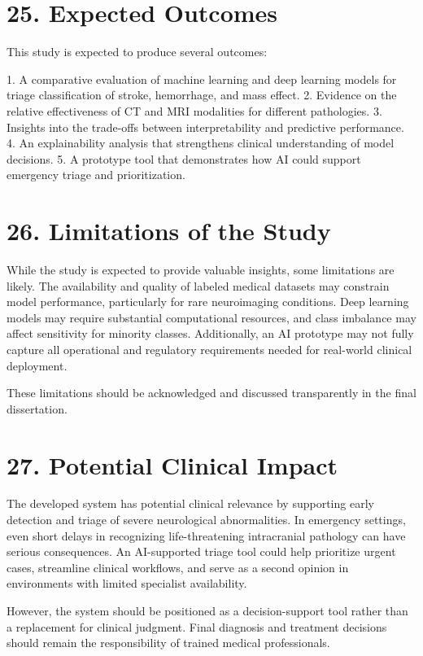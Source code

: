 \documentclass[12pt,a4paper]{report}
\begin{document}
\section{25. Expected Outcomes}

This study is expected to produce several outcomes:

1. A comparative evaluation of machine learning and deep learning models for triage classification of stroke, hemorrhage, and mass effect.
2. Evidence on the relative effectiveness of CT and MRI modalities for different pathologies.
3. Insights into the trade-offs between interpretability and predictive performance.
4. An explainability analysis that strengthens clinical understanding of model decisions.
5. A prototype tool that demonstrates how AI could support emergency triage and prioritization.


\section{26. Limitations of the Study}

While the study is expected to provide valuable insights, some limitations are likely. The availability and quality of labeled medical datasets may constrain model performance, particularly for rare neuroimaging conditions. Deep learning models may require substantial computational resources, and class imbalance may affect sensitivity for minority classes. Additionally, an AI prototype may not fully capture all operational and regulatory requirements needed for real-world clinical deployment.

These limitations should be acknowledged and discussed transparently in the final dissertation.


\section{27. Potential Clinical Impact}

The developed system has potential clinical relevance by supporting early detection and triage of severe neurological abnormalities. In emergency settings, even short delays in recognizing life-threatening intracranial pathology can have serious consequences. An AI-supported triage tool could help prioritize urgent cases, streamline clinical workflows, and serve as a second opinion in environments with limited specialist availability.

However, the system should be positioned as a decision-support tool rather than a replacement for clinical judgment. Final diagnosis and treatment decisions should remain the responsibility of trained medical professionals.
\end{document}
